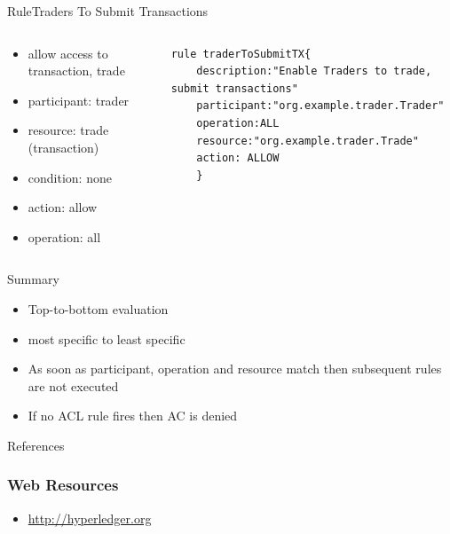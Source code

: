 \documentclass[pdf,table]{beamer}
\begin{document}
\begin{frame}[fragile]{Rule}{Traders To Submit Transactions}
	\begin{columns}[T]
		\begin{column}{0.48\textwidth}
			\begin{itemize}
				\item allow access to transaction, trade
				\item participant: trader
				\item resource: trade (transaction)
				\item condition: none
				\item action: allow
				\item operation: all
			\end{itemize}
		\end{column}
		\begin{column}{0.48\textwidth}
			\begin{lstlisting}[language=ACL]
rule traderToSubmitTX{
	description:"Enable Traders to trade, submit transactions"
	participant:"org.example.trader.Trader"
	operation:ALL
	resource:"org.example.trader.Trade"
	action: ALLOW
	}
			\end{lstlisting}
		\end{column}
	\end{columns}	
\end{frame}



%


\begin{frame}{Summary}
	\begin{itemize}
		\item Top-to-bottom evaluation
		\item most specific to least specific
		\item As soon as participant, operation and resource match then subsequent rules are not executed
		\item If no ACL rule fires then AC is denied
	\end{itemize}
\end{frame}

\begin{frame}[allowframebreaks]{References}

\printbibliography
	
\end{frame}
	
\begin{frame}
	\frametitle{Web Resources}
	\begin{itemize}
	\item \url{http://hyperledger.org}
	\end{itemize}
\end{frame}
\end{document}
